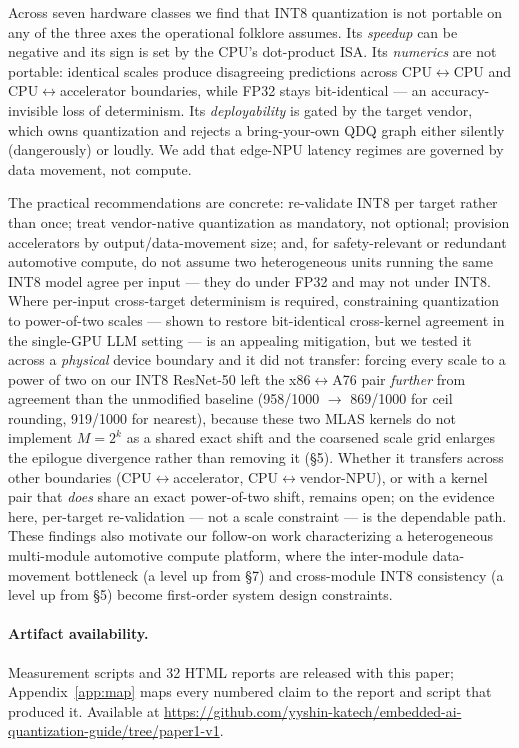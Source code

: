 \documentclass[11pt]{article}
\begin{document}
Across seven hardware classes we find that INT8 quantization is not portable on any of the three axes the operational folklore assumes. Its \emph{speedup} can be negative and its sign is set by the CPU's dot-product ISA. Its \emph{numerics} are not portable: identical scales produce disagreeing predictions across CPU$\leftrightarrow$CPU and CPU$\leftrightarrow$accelerator boundaries, while FP32 stays bit-identical --- an accuracy-invisible loss of determinism. Its \emph{deployability} is gated by the target vendor, which owns quantization and rejects a bring-your-own QDQ graph either silently (dangerously) or loudly. We add that edge-NPU latency regimes are governed by data movement, not compute.

The practical recommendations are concrete: re-validate INT8 per target rather than once; treat vendor-native quantization as mandatory, not optional; provision accelerators by output/data-movement size; and, for safety-relevant or redundant automotive compute, do not assume two heterogeneous units running the same INT8 model agree per input --- they do under FP32 and may not under INT8. Where per-input cross-target determinism is required, constraining quantization to power-of-two scales --- shown to restore bit-identical cross-kernel agreement in the single-GPU LLM setting \citep{chen2026deterministic} --- is an appealing mitigation, but we tested it across a \emph{physical} device boundary and it did not transfer: forcing every scale to a power of two on our INT8 ResNet-50 left the x86$\leftrightarrow$A76 pair \emph{further} from agreement than the unmodified baseline (958/1000 $\to$ 869/1000 for ceil rounding, 919/1000 for nearest), because these two MLAS kernels do not implement $M = 2^k$ as a shared exact shift and the coarsened scale grid enlarges the epilogue divergence rather than removing it (\S5). Whether it transfers across other boundaries (CPU$\leftrightarrow$accelerator, CPU$\leftrightarrow$vendor-NPU), or with a kernel pair that \emph{does} share an exact power-of-two shift, remains open; on the evidence here, per-target re-validation --- not a scale constraint --- is the dependable path. These findings also motivate our follow-on work characterizing a heterogeneous multi-module automotive compute platform, where the inter-module data-movement bottleneck (a level up from \S7) and cross-module INT8 consistency (a level up from \S5) become first-order system design constraints.

\paragraph{Artifact availability.} Measurement scripts and 32 HTML reports are released with this paper; Appendix~\ref{app:map} maps every numbered claim to the report and script that produced it. Available at \url{https://github.com/yyshin-katech/embedded-ai-quantization-guide/tree/paper1-v1}.
\end{document}
